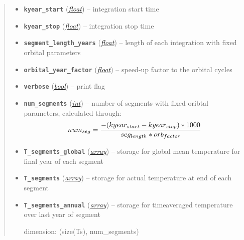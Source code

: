 \documentclass[a4paper,10pt,english]{sphinxmanual}
\begin{document}
\begin{fulllineitems}
\begin{quote}
\begin{description}
\begin{itemize}
\item {} 
\textbf{\texttt{kyear\_start}} (\href{http://docs.python.org/2.7/library/functions.html\#float}{\emph{float}}) -- integration start time

\item {} 
\textbf{\texttt{kyear\_stop}} (\href{http://docs.python.org/2.7/library/functions.html\#float}{\emph{float}}) -- integration stop time

\item {} 
\textbf{\texttt{segment\_length\_years}} (\href{http://docs.python.org/2.7/library/functions.html\#float}{\emph{float}}) -- length of each integration with
fixed orbital parameters

\item {} 
\textbf{\texttt{orbital\_year\_factor}} (\href{http://docs.python.org/2.7/library/functions.html\#float}{\emph{float}}) -- speed-up factor  to the orbital cycles

\item {} 
\textbf{\texttt{verbose}} (\href{http://docs.python.org/2.7/library/functions.html\#bool}{\emph{bool}}) -- print flag

\item {} 
\textbf{\texttt{num\_segments}} (\href{http://docs.python.org/2.7/library/functions.html\#int}{\emph{int}}) -- 
number of segments with fixed oribtal 
parameters, calculated through:
\begin{gather}
\begin{split}num_{seg} = \frac{-(kyear_{start}-kyear_{stop})*1000}{seg_{length} * orb_{factor}}\end{split}\notag
\end{gather}

\item {} 
\textbf{\texttt{T\_segments\_global}} (\href{http://docs.python.org/2.7/library/array.html\#module-array}{\emph{array}}) -- storage for global mean temperature
for final year of each segment

\item {} 
\textbf{\texttt{T\_segments}} (\href{http://docs.python.org/2.7/library/array.html\#module-array}{\emph{array}}) -- storage for actual temperature at end
of each segment

\item {} 
\textbf{\texttt{T\_segments\_annual}} (\href{http://docs.python.org/2.7/library/array.html\#module-array}{\emph{array}}) -- 
storage for timeaveraged temperature 
over last year of segment

dimension: (size(Ts), num\_segments)



\end{itemize}
\end{description}
\end{quote}
\end{fulllineitems}
\end{document}
